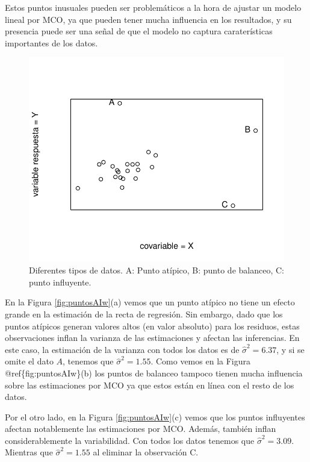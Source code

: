 \documentclass[
]{article}
\begin{document}
Estos puntos inusuales pueden ser problemáticos a la hora de ajustar un modelo lineal por MCO, ya que pueden tener mucha influencia en los resultados, y su presencia puede ser una señal de que el modelo no captura caraterísticas importantes de los datos.

\begin{figure}

{\centering \includegraphics{MLG1_files/figure-latex/puntosAI-1} 

}

\caption{Diferentes tipos de datos. A: Punto atípico, B: punto de balanceo, C: punto influyente.}\label{fig:puntosAI}
\end{figure}

En la Figura \ref{fig:puntosAIw}(a) vemos que un punto atípico no tiene un efecto grande en la estimación de la recta de regresión. Sin embargo, dado que los puntos atípicos generan valores altos (en valor absoluto) para los residuos, estas observaciones inflan la varianza de las estimaciones y afectan las inferencias. En este caso, la estimación de la varianza con todos los datos es de \(\widehat{\sigma}^{2}=6.37\), y si se omite el dato \(A\), tenemos que \(\widehat{\sigma}^{2}=1.55\). Como vemos en la Figura @ref\{fig:puntosAIw\}(b) los puntos de balanceo tampoco tienen mucha influencia sobre las estimaciones por MCO ya que estos están en línea con el resto de los datos.

Por el otro lado, en la Figura \ref{fig:puntosAIw}(c) vemos que los puntos influyentes afectan notablemente las estimaciones por MCO. Además, también inflan considerablemente la variabilidad. Con todos los datos tenemos que \(\widehat{\sigma}^{2}=3.09\). Mientras que \(\widehat{\sigma}^{2}=1.55\) al eliminar la observación C.
\end{document}
